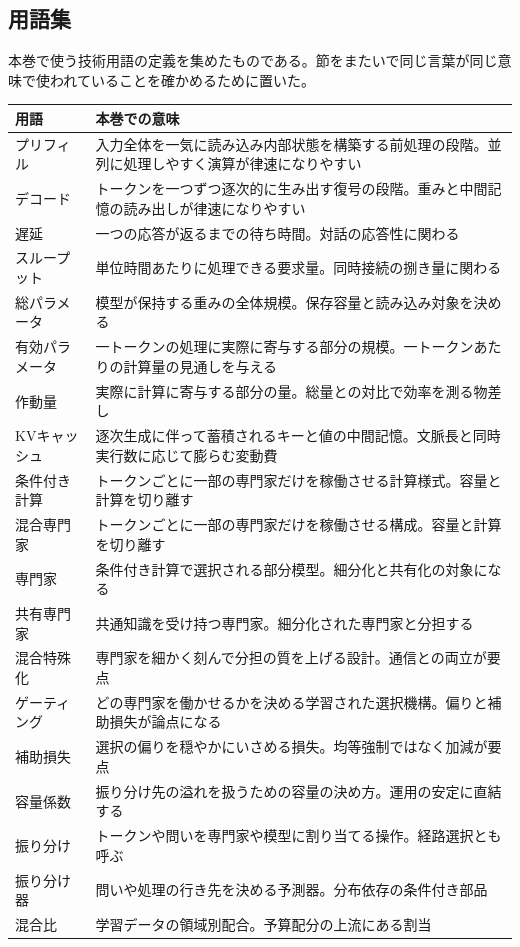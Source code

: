\documentclass[lualatex,a4paper,10pt]{jlreq}
\begin{document}
\subsection*{用語集}
本巻で使う技術用語の定義を集めたものである。節をまたいで同じ言葉が同じ意味で使われていることを確かめるために置いた。\par
\noindent
\begin{tabular}{@{}p{}p{}@{}}
\toprule
用語 & 本巻での意味 \\
\midrule
プリフィル & 入力全体を一気に読み込み内部状態を構築する前処理の段階。並列に処理しやすく演算が律速になりやすい \\
デコード & トークンを一つずつ逐次的に生み出す復号の段階。重みと中間記憶の読み出しが律速になりやすい \\
遅延 & 一つの応答が返るまでの待ち時間。対話の応答性に関わる \\
スループット & 単位時間あたりに処理できる要求量。同時接続の捌き量に関わる \\
総パラメータ & 模型が保持する重みの全体規模。保存容量と読み込み対象を決める \\
有効パラメータ & 一トークンの処理に実際に寄与する部分の規模。一トークンあたりの計算量の見通しを与える \\
作動量 & 実際に計算に寄与する部分の量。総量との対比で効率を測る物差し \\
KVキャッシュ & 逐次生成に伴って蓄積されるキーと値の中間記憶。文脈長と同時実行数に応じて膨らむ変動費 \\
条件付き計算 & トークンごとに一部の専門家だけを稼働させる計算様式。容量と計算を切り離す \\
混合専門家 & トークンごとに一部の専門家だけを稼働させる構成。容量と計算を切り離す \\
専門家 & 条件付き計算で選択される部分模型。細分化と共有化の対象になる \\
共有専門家 & 共通知識を受け持つ専門家。細分化された専門家と分担する \\
混合特殊化 & 専門家を細かく刻んで分担の質を上げる設計。通信との両立が要点 \\
ゲーティング & どの専門家を働かせるかを決める学習された選択機構。偏りと補助損失が論点になる \\
補助損失 & 選択の偏りを穏やかにいさめる損失。均等強制ではなく加減が要点 \\
容量係数 & 振り分け先の溢れを扱うための容量の決め方。運用の安定に直結する \\
振り分け & トークンや問いを専門家や模型に割り当てる操作。経路選択とも呼ぶ \\
振り分け器 & 問いや処理の行き先を決める予測器。分布依存の条件付き部品 \\
混合比 & 学習データの領域別配合。予算配分の上流にある割当 \\
\bottomrule
\end{tabular}
\normalsize
\end{document}
